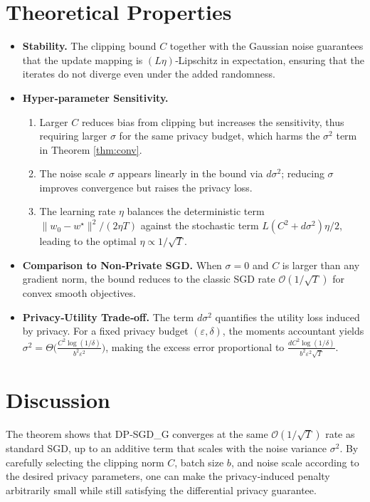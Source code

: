 \documentclass{article}
\begin{document}
\bigskip

\section*{Theoretical Properties}
\begin{itemize}[leftmargin=*]
\item \textbf{Stability.} The clipping bound $C$ together with the Gaussian noise guarantees that the update mapping is $(L\eta)$‑Lipschitz in expectation, ensuring that the iterates do not diverge even under the added randomness.
\item \textbf{Hyper‑parameter Sensitivity.}
    \begin{enumerate}
        \item Larger $C$ reduces bias from clipping but increases the sensitivity, thus requiring larger $\sigma$ for the same privacy budget, which harms the $\sigma^{2}$ term in Theorem \ref{thm:conv}.
        \item The noise scale $\sigma$ appears linearly in the bound via $d\sigma^{2}$; reducing $\sigma$ improves convergence but raises the privacy loss.
        \item The learning rate $\eta$ balances the deterministic term $\|w_0-w^{\star}\|^{2}/(2\eta T)$ against the stochastic term $L(C^{2}+d\sigma^{2})\eta/2$, leading to the optimal $\eta\propto1/\sqrt{T}$.
    \end{enumerate}
\item \textbf{Comparison to Non‑Private SGD.} When $\sigma=0$ and $C$ is larger than any gradient norm, the bound reduces to the classic SGD rate $\mathcal{O}(1/\sqrt{T})$ for convex smooth objectives.
\item \textbf{Privacy‑Utility Trade‑off.} The term $d\sigma^{2}$ quantifies the utility loss induced by privacy. For a fixed privacy budget $(\varepsilon,\delta)$, the moments accountant yields $\sigma^{2}= \Theta\!\bigl(\frac{C^{2}\log(1/\delta)}{b^{2}\varepsilon^{2}}\bigr)$, making the excess error proportional to $\frac{dC^{2}\log(1/\delta)}{b^{2}\varepsilon^{2}\sqrt{T}}$.
\end{itemize}

\bigskip

\section*{Discussion}
The theorem shows that DP‑SGD\_G converges at the same $\mathcal{O}(1/\sqrt{T})$ rate as standard SGD, up to an additive term that scales with the noise variance $\sigma^{2}$. By carefully selecting the clipping norm $C$, batch size $b$, and noise scale according to the desired privacy parameters, one can make the privacy‑induced penalty arbitrarily small while still satisfying the differential privacy guarantee.
\end{document}

